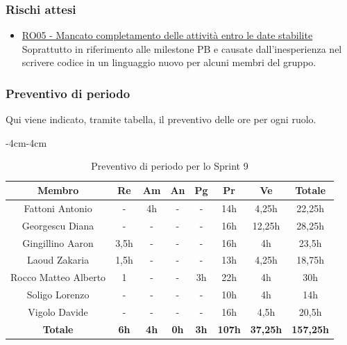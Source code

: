 \documentclass[a4paper,12pt]{article}
\begin{document}
\subsubsection{Rischi attesi}
\begin{itemize}
    \item \hyperref[RO05]{RO05 - Mancato completamento delle attività entro le date stabilite} \\Soprattutto in riferimento alle milestone PB e causate dall'inesperienza nel scrivere codice in un linguaggio nuovo per alcuni membri del gruppo.
\end{itemize}

\subsubsection{Preventivo di periodo}
Qui viene indicato, tramite tabella, il preventivo delle ore per ogni ruolo.

\begin{table}[H]
    \begin{adjustwidth}{-4cm}{-4cm}
    \centering
    \begin{tabular}{|c|c|c|c|c|c|c|c|}
        \hline
        \textbf{Membro} & \textbf{Re} & \textbf{Am} & \textbf{An} & \textbf{Pg} & \textbf{Pr} & \textbf{Ve} & \textbf{Totale} \\
        \hline
        Fattoni Antonio & - & 4h & - & - & 14h & 4,25h & 22,25h \\
        \hline
        Georgescu Diana & - & - & - & - & 16h & 12,25h & 28,25h \\
        \hline
        Gingillino Aaron & 3,5h & - & - & - & 16h & 4h & 23,5h \\
        \hline
        Laoud Zakaria & 1,5h & - & - & - & 13h & 4,25h & 18,75h \\
        \hline
        Rocco Matteo Alberto & 1 & - & - & 3h & 22h & 4h & 30h \\
        \hline
        Soligo Lorenzo & - & - & - & - & 10h & 4h & 14h \\
        \hline
        Vigolo Davide & - & - & - & - & 16h & 4,5h & 20,5h \\
        \hline
          \textbf{Totale} & \textbf{6h} & \textbf{4h} & \textbf{0h} & \textbf{3h} & \textbf{107h} & \textbf{37,25h} & \textbf{157,25h} \\
        \hline
    \end{tabular}
    \caption{Preventivo di periodo per lo Sprint 9}
    \end{adjustwidth}
\end{table}
\end{document}
